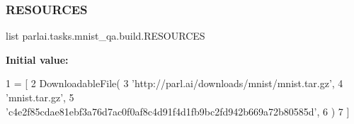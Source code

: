 \subsubsection{\texorpdfstring{R\+E\+S\+O\+U\+R\+C\+ES}{RESOURCES}}
{\footnotesize\ttfamily list parlai.\+tasks.\+mnist\+\_\+qa.\+build.\+R\+E\+S\+O\+U\+R\+C\+ES}

{\bfseries Initial value\+:}
\begin{DoxyCode}
1 =  [
2     DownloadableFile(
3         \textcolor{stringliteral}{'http://parl.ai/downloads/mnist/mnist.tar.gz'},
4         \textcolor{stringliteral}{'mnist.tar.gz'},
5         \textcolor{stringliteral}{'c4e2f85cdae81ebf3a76d7ac0f0af8c4d91f4d1fb9bc2fd942b669a72b80585d'},
6     )
7 ]
\end{DoxyCode}

